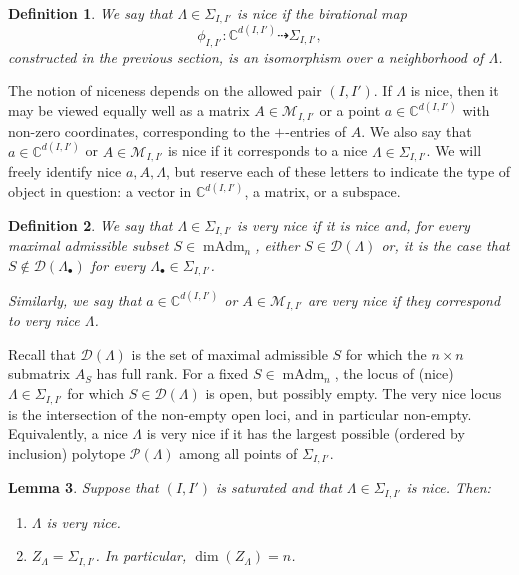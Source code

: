 \documentclass[12pt]{amsart}
\newtheorem{definition}{Definition}[subsection]
\newtheorem{lemma}[definition]{Lemma}
\DeclareMathOperator{\mAdm}{mAdm}
\newcommand{\bC}{\mathbb{C}}
\newcommand{\cD}{\mathcal{D}}
\newcommand{\cM}{\mathcal{M}}
\newcommand{\cP}{\mathcal{P}}
\begin{document}
\begin{definition}\label{def:nice}
We say that $\Lambda\in\Sigma_{I,I'}$ is \emph{nice} if the birational map
\begin{equation*}
    \phi_{I,I'}:\bC^{d(I,I')}\dashrightarrow\Sigma_{I,I'},
\end{equation*}
constructed in the previous section, is an isomorphism over a neighborhood of $\Lambda$.
\end{definition}
The notion of niceness depends on the allowed pair $(I,I')$. If $\Lambda$ is nice, then it may be viewed equally well as a matrix $A\in\cM_{I,I'}$ or a point $a
\in \bC^{d(I,I')}$ with non-zero coordinates, corresponding to the $+$-entries of $A$. We also say that $a\in \bC^{d(I,I')}$ or $A\in\cM_{I,I'}$ is nice if it corresponds to a nice $\Lambda\in \Sigma_{I,I'}$. We will freely identify nice $a,A,\Lambda$, but reserve each of these letters to indicate the type of object in question: a vector in $\bC^{d(I,I')}$, a matrix, or a subspace.

\begin{definition}
    We say that $\Lambda\in\Sigma_{I,I'}$ is \emph{very nice} if it is nice and, for every maximal admissible subset $S\in \mAdm_n$, either $S\in\cD(\Lambda)$ or, it is the case that $S\notin\cD(\Lambda_\bullet)$ for \emph{every} $\Lambda_\bullet\in \Sigma_{I,I'}$.

    Similarly, we say that $a\in\bC^{d(I,I')}$ or $A\in\cM_{I,I'}$ are very nice if they correspond to very nice $\Lambda$.
\end{definition}

Recall that $\cD(\Lambda)$ is the set of maximal admissible $S$ for which the $n\times n$ submatrix $A_S$ has full rank. For a fixed $S\in\mAdm_n$, the locus of (nice) $\Lambda\in\Sigma_{I,I'}$ for which $S\in\cD(\Lambda)$ is open, but possibly empty. The very nice locus is the intersection of the non-empty open loci, and in particular non-empty. Equivalently, a nice $\Lambda$ is very nice if it has the largest possible (ordered by inclusion) polytope $\cP(\Lambda)$ among all points of $\Sigma_{I,I'}$.

\begin{lemma}\label{lem:very_nice_saturated}
    Suppose that $(I,I')$ is saturated and that $\Lambda\in \Sigma_{I,I'}$ is nice. Then:
    \begin{enumerate}
    \item[(a)] $\Lambda$ is very nice. 
    \item[(b)] $Z_{\Lambda}=\Sigma_{I,I'}$. In particular, $\dim(Z_\Lambda)=n$.
    \end{enumerate}
\end{lemma}
\end{document}

